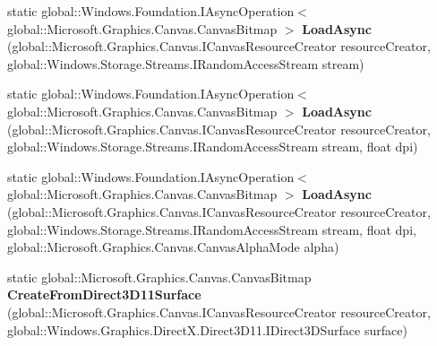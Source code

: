 \begin{DoxyCompactItemize}
\item 
\mbox{\label{class_microsoft_1_1_graphics_1_1_canvas_1_1_canvas_bitmap_af12c77561765c9cbef9957e4bb137793}} 
static global\+::\+Windows.\+Foundation.\+I\+Async\+Operation$<$ global\+::\+Microsoft.\+Graphics.\+Canvas.\+Canvas\+Bitmap $>$ {\bfseries Load\+Async} (global\+::\+Microsoft.\+Graphics.\+Canvas.\+I\+Canvas\+Resource\+Creator resource\+Creator, global\+::\+Windows.\+Storage.\+Streams.\+I\+Random\+Access\+Stream stream)
\item 
\mbox{\label{class_microsoft_1_1_graphics_1_1_canvas_1_1_canvas_bitmap_ad38ec735e08607b9ecf7bbd6f1a7d229}} 
static global\+::\+Windows.\+Foundation.\+I\+Async\+Operation$<$ global\+::\+Microsoft.\+Graphics.\+Canvas.\+Canvas\+Bitmap $>$ {\bfseries Load\+Async} (global\+::\+Microsoft.\+Graphics.\+Canvas.\+I\+Canvas\+Resource\+Creator resource\+Creator, global\+::\+Windows.\+Storage.\+Streams.\+I\+Random\+Access\+Stream stream, float dpi)
\item 
\mbox{\label{class_microsoft_1_1_graphics_1_1_canvas_1_1_canvas_bitmap_a3f15d77e2e8485e54d0e45d2f972764d}} 
static global\+::\+Windows.\+Foundation.\+I\+Async\+Operation$<$ global\+::\+Microsoft.\+Graphics.\+Canvas.\+Canvas\+Bitmap $>$ {\bfseries Load\+Async} (global\+::\+Microsoft.\+Graphics.\+Canvas.\+I\+Canvas\+Resource\+Creator resource\+Creator, global\+::\+Windows.\+Storage.\+Streams.\+I\+Random\+Access\+Stream stream, float dpi, global\+::\+Microsoft.\+Graphics.\+Canvas.\+Canvas\+Alpha\+Mode alpha)
\item 
\mbox{\label{class_microsoft_1_1_graphics_1_1_canvas_1_1_canvas_bitmap_adb53e7172552d09bc317b5b85c254fff}} 
static global\+::\+Microsoft.\+Graphics.\+Canvas.\+Canvas\+Bitmap {\bfseries Create\+From\+Direct3\+D11\+Surface} (global\+::\+Microsoft.\+Graphics.\+Canvas.\+I\+Canvas\+Resource\+Creator resource\+Creator, global\+::\+Windows.\+Graphics.\+Direct\+X.\+Direct3\+D11.\+I\+Direct3\+D\+Surface surface)
\item 
\mbox{\label{class_microsoft_1_1_graphics_1_1_canvas_1_1_canvas_bitmap_a9bcb0865c8ef9a544991db05907b06ff}} 

\end{DoxyCompactItemize}
